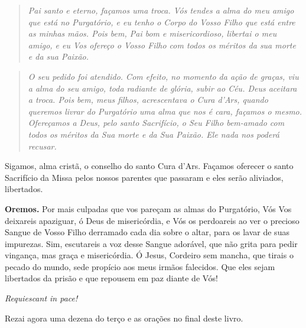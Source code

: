 \begin{quote}
\textit{\textit{Pai santo e eterno, façamos uma troca. Vós tendes a alma do meu amigo que está no Purgatório, e eu tenho o Corpo do Vosso Filho que está entre as minhas mãos. Pois bem, Pai bom e misericordioso, libertai o meu amigo, e eu Vos ofereço o Vosso Filho com todos os méritos da sua morte e da sua Paixão.}}
\end{quote}

\begin{quote}
\textit{\textit{O seu pedido foi atendido. Com efeito, no momento da ação de graças, viu a alma do seu amigo, toda radiante de glória, subir ao Céu. Deus aceitara a troca. Pois bem, meus filhos, acrescentava o Cura d’Ars, quando queremos livrar do Purgatório uma alma que nos é cara, façamos o mesmo. Ofereçamos a Deus, pelo santo Sacrifício, o Seu Filho bem-amado com todos os méritos da Sua morte e da Sua Paixão. Ele nada nos poderá recusar.}}
\end{quote}

Sigamos, alma cristã, o conselho do santo Cura d’Ars. Façamos oferecer o santo Sacrifício da Missa pelos nossos parentes que passaram e eles serão aliviados, libertados.


\vspace{\baselineskip}\noindent \textbf{Oremos.} Por mais culpadas que vos pareçam as almas do Purgatório, Vós Vos deixareis apaziguar, ó Deus de misericórdia, e Vós os perdoareis ao ver o precioso Sangue de Vosso Filho derramado cada dia sobre o altar, para os lavar de suas impurezas. Sim, escutareis a voz desse Sangue adorável, que não grita para pedir vingança, mas graça e misericórdia. Ó Jesus, Cordeiro sem mancha, que tirais o pecado do mundo, sede propício aos meus irmãos falecidos. Que eles sejam libertados da prisão e que repousem em paz diante de Vós!



\begin{center}
\textit{Requiescant in pace!}
\end{center}

Rezai agora uma dezena do terço e as orações no final deste livro.
